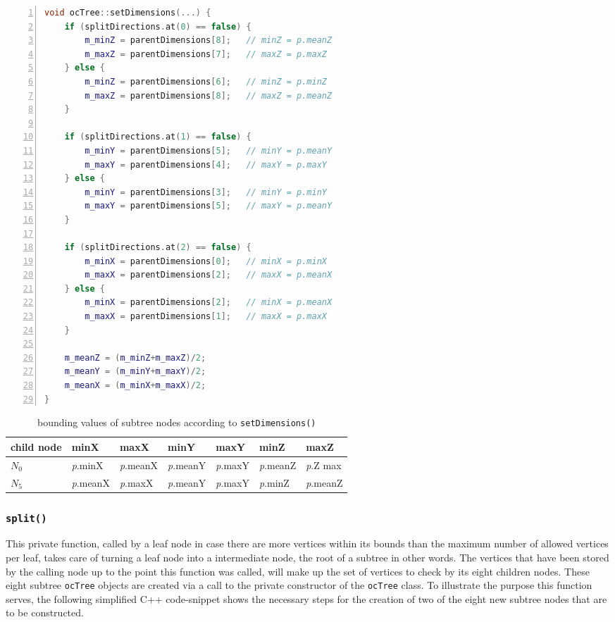 \begin{minipage}{\linewidth}
\begin{lstlisting}[language=C++,numberstyle=\zebra{black!5}{white}{},numbers=left,xleftmargin=2em,tabsize=3]
void ocTree::setDimensions(...) {
	if (splitDirections.at(0) == false) {
		m_minZ = parentDimensions[8];	// minZ = p.meanZ
		m_maxZ = parentDimensions[7];	// maxZ = p.maxZ
	} else {
		m_minZ = parentDimensions[6];	// minZ = p.minZ
		m_maxZ = parentDimensions[8];	// maxZ = p.meanZ
	}

	if (splitDirections.at(1) == false) {
		m_minY = parentDimensions[5];	// minY = p.meanY
		m_maxY = parentDimensions[4];	// maxY = p.maxY
	} else {
		m_minY = parentDimensions[3];	// minY = p.minY
		m_maxY = parentDimensions[5];	// maxY = p.meanY
	}

	if (splitDirections.at(2) == false) {
		m_minX = parentDimensions[0];	// minX = p.minX
		m_maxX = parentDimensions[2];	// maxX = p.meanX
	} else {
		m_minX = parentDimensions[2];	// minX = p.meanX
		m_maxX = parentDimensions[1];	// maxX = p.maxX
	}

	m_meanZ = (m_minZ+m_maxZ)/2;
	m_meanY = (m_minY+m_maxY)/2;
	m_meanX = (m_minX+m_maxX)/2;
}
\end{lstlisting}
\end{minipage}

\begin{table}[]
\begin{tabular}{l|llllll}
child node & minX & maxX & minY & maxY & minZ & maxZ \\ \hline
\textit{$N_0$} & \textit{p}.minX & \textit{p}.meanX & \textit{p}.meanY & \textit{p}.maxY & \textit{p}.meanZ & \textit{p}.Z max \\
\textit{$N_5$} & \textit{p}.meanX & \textit{p}.maxX & \textit{p}.meanY & \textit{p}.maxY & \textit{p}.minZ & \textit{p}.meanZ \\
\end{tabular}
\caption{bounding values of subtree nodes according to \texttt{setDimensions()}}\label{tab:bounding_values_subtree_nodes}
\end{table}

	\subsubsection{\texttt{split()}}
	\label{sec:split}
This private function, called by a leaf node in case there are more vertices within its bounds than the maximum number of allowed vertices per leaf, takes care of turning a leaf node into a intermediate node, the root of a subtree in other words. The vertices that have been stored by the calling node up to the point this function was called, will make up the set of vertices to check by its eight children nodes. These eight subtree \texttt{ocTree} objects are created via a call to the private constructor of the \texttt{ocTree} class. To illustrate the purpose this function serves, the following simplified C++ code-snippet shows the necessary steps for the creation of two of the eight new subtree nodes that are to be constructed.

